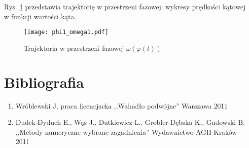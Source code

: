 \documentclass[11pt]{aghdpl}
\begin{document}
Rys. \ref{phi_omega} przedstawia trajektorię w przestrzeni fazowej: wykresy prędkości kątowej w funkcji wartości kąta.
\begin{figure}[h!]
	\centering
	\texttt{[image: phi1\_omega1.pdf]}
	\caption{Trajektoria w przestrzeni fazowej $\omega(\varphi(t))$	}
	\label{phi_omega}
\end{figure}

\clearpage
\section{Bibliografia}
\renewcommand*\labelenumi{[\theenumi]}

\begin{enumerate}
\item Wróblewski J. praca licencjacka ,,Wahadło podwójne'' Warszawa 2011 \label{bib_one}
\item Dudek-Dyduch E., Wąs J., Dutkiewicz L., Grobler-Dębska K., Gudowski B. ,,Metody numeryczne wybrane zagadnienia'' Wydawnictwo AGH Kraków 2011 \label{bib_two}

\end{enumerate}
\end{document}
